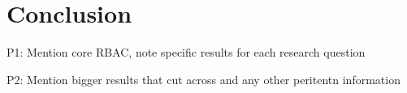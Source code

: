 \section{Conclusion} \label{sec:conclusion}

P1: Mention core RBAC, note specific results for each research question

P2: Mention bigger results that cut across and any other peritentn information
